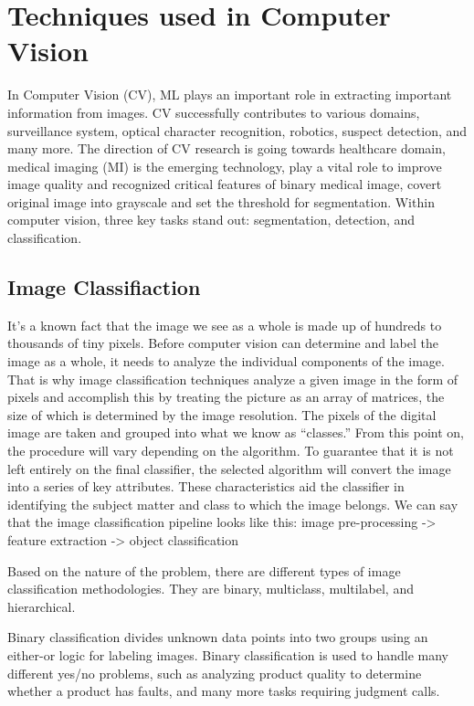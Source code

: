 \section{Techniques used in Computer Vision }

In Computer Vision (CV), ML plays an important role in extracting important information from images. CV successfully contributes to various domains, surveillance system, optical character recognition, robotics, suspect detection, and many more.  The direction of CV research is going towards healthcare domain, medical imaging (MI) is the emerging technology, play a vital role to improve image quality and recognized critical features of binary medical image, covert original image into grayscale and set the threshold for segmentation.
Within computer vision, three key tasks stand out: segmentation, detection, and classification. 
\subsection*{Image Classifiaction}
	It's a known fact that the image we see as a whole is made up of hundreds to thousands of tiny pixels. Before computer vision can determine and label the image as a whole, it needs to analyze the individual components of the image. That is why image classification techniques analyze a given image in the form of pixels and accomplish this by treating the picture as an array of matrices, the size of which is determined by the image resolution. The pixels of the digital image are taken and grouped into what we know as “classes.” From this point on, the procedure will vary depending on the algorithm. To guarantee that it is not left entirely on the final classifier, the selected algorithm will convert the image into a series of key attributes. These characteristics aid the classifier in identifying the subject matter and class to which the image belongs. 
	We can say that the image classification pipeline looks like this:
	image pre-processing -> feature extraction -> object classification
	
	
	Based on the nature of the problem, there are different types of image classification methodologies. They are binary, multiclass, multilabel, and hierarchical.
	
	Binary classification divides unknown data points into two groups using an either-or logic for labeling images. Binary classification is used to handle many different yes/no problems, such as analyzing product quality to determine whether a product has faults, and many more tasks requiring judgment calls.
	
